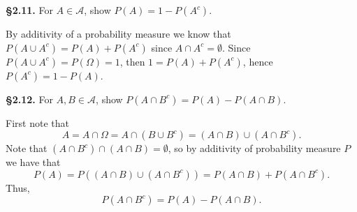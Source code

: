 \documentclass[11pt,reqno]{amsart}
\newcommand{\tbox}[2]{\begin{tcolorbox}[colback=white, sharp corners]\textbf{\S#1.} #2 \end{tcolorbox}}
\begin{document}
\tbox{2.11}{ 
    For $A \in \mathcal{A}$, show $P(A) = 1 - P(A^c)$.
}
By additivity of a probability measure we know that $P(A\cup A^c)=P(A)+P(A^c)$ since $A \cap A^c= \emptyset$. 
Since $P(A\cup A^c) = P(\Omega) = 1$, then $1 = P(A) + P(A^c)$, hence $P(A^c) = 1 - P(A)$.

\tbox{2.12}{
For $A,B \in \mathcal{A}$, show $P(A \cap B^c) = P(A)-P(A \cap B)$.
}
First note that
$$
    A = A \cap \Omega =A\cap (B\cup B^c)=(A\cap B) \cup (A\cap B^c).
$$ 
Note that $(A\cap B^c) \cap (A\cap B) = \emptyset$, so  by additivity of probability measure $P$ we have that 
$$
    P(A)=P((A\cap B) \cup (A \cap B^c))=P(A \cap B) + P( A\cap B^c).
$$
Thus,  
$$
    P(A \cap B^c) = P(A)-P(A \cap B).
$$
\end{document}
